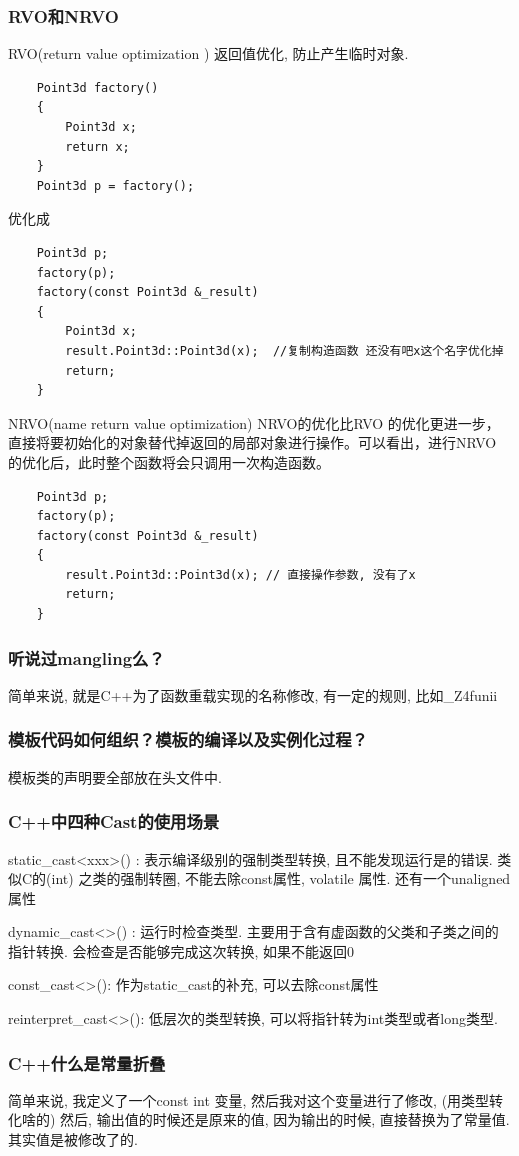 \subsubsection{RVO和NRVO}
RVO(return value optimization ) 返回值优化, 防止产生临时对象. \par
\begin{lstlisting}
	Point3d factory()
	{
		Point3d x;
		return x;
	}
	Point3d p = factory();
\end{lstlisting}
优化成
\begin{lstlisting}
	Point3d p;
	factory(p);
	factory(const Point3d &_result)
	{
		Point3d x;
		result.Point3d::Point3d(x);  //复制构造函数 还没有吧x这个名字优化掉
		return;
	}
\end{lstlisting}
NRVO(name return value optimization) NRVO的优化比RVO 的优化更进一步，直接将要初始化的对象替代掉返回的局部对象进行操作。可以看出，进行NRVO 的优化后，此时整个函数将会只调用一次构造函数。
\begin{lstlisting}
	Point3d p;
	factory(p);
	factory(const Point3d &_result)
	{
		result.Point3d::Point3d(x); // 直接操作参数, 没有了x
		return;
	}
\end{lstlisting}
\subsubsection{听说过mangling么？}
简单来说, 就是C++为了函数重载实现的名称修改, 有一定的规则, 比如\_Z4funii \par
\subsubsection{模板代码如何组织？模板的编译以及实例化过程？}
模板类的声明要全部放在头文件中.
\subsubsection{C++中四种Cast的使用场景}
static\_cast<xxx>() : 表示编译级别的强制类型转换, 且不能发现运行是的错误. 类似C的(int) 之类的强制转圈, 不能去除const属性, volatile 属性. 还有一个unaligned属性 \par
dynamic\_cast<>() : 运行时检查类型. 主要用于含有虚函数的父类和子类之间的指针转换. 会检查是否能够完成这次转换, 如果不能返回0 \par
const\_cast<>(): 作为static\_cast的补充, 可以去除const属性 \par
reinterpret\_cast<>(): 低层次的类型转换, 可以将指针转为int类型或者long类型. \par
\subsubsection{C++什么是常量折叠}
简单来说, 我定义了一个const int 变量, 然后我对这个变量进行了修改, (用类型转化啥的) 然后, 输出值的时候还是原来的值, 因为输出的时候, 直接替换为了常量值. 其实值是被修改了的.

